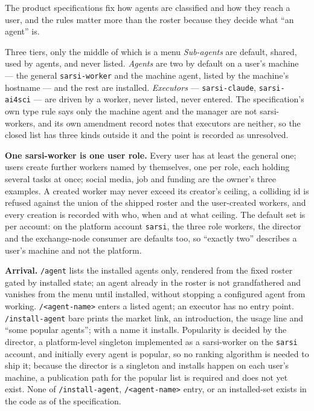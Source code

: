 \documentclass[11pt]{article}
\theoremstyle{definition}
\begin{document}
The product specifications fix how agents are classified and how they reach a user, and the rules matter more than the roster because they decide what ``an agent'' is.

\begin{claimbox}{Three tiers, only the middle of which is a menu}
\emph{Sub-agents} are default, shared, used by agents, and never listed. \emph{Agents} are two by default on a user's machine --- the general \texttt{sarsi-worker} and the machine agent, listed by the machine's hostname --- and the rest are installed. \emph{Executors} --- \texttt{sarsi-claude}, \texttt{sarsi-ai4sci} --- are driven by a worker, never listed, never entered. The specification's own type rule says only the machine agent and the manager are not sarsi-workers, and its own amendment record notes that executors are neither, so the closed list has three kinds outside it and the point is recorded as unresolved.
\end{claimbox}

\textbf{One sarsi-worker is one user role.} Every user has at least the general one; users create further workers named by themselves, one per role, each holding several tasks at once; social media, job and funding are the owner's three examples. A created worker may never exceed its creator's ceiling, a colliding id is refused against the union of the shipped roster and the user-created workers, and every creation is recorded with who, when and at what ceiling. The default set is per account: on the platform account \texttt{sarsi}, the three role workers, the director and the exchange-node consumer are defaults too, so ``exactly two'' describes a user's machine and not the platform.

\textbf{Arrival.} \texttt{/agent} lists the installed agents only, rendered from the fixed roster gated by installed state; an agent already in the roster is not grandfathered and vanishes from the menu until installed, without stopping a configured agent from working. \texttt{/<agent-name>} enters a listed agent; an executor has no entry point. \texttt{/install-agent} bare prints the market link, an introduction, the usage line and ``some popular agents''; with a name it installs. Popularity is decided by the director, a platform-level singleton implemented as a sarsi-worker on the \texttt{sarsi} account, and initially every agent is popular, so no ranking algorithm is needed to ship it; because the director is a singleton and installs happen on each user's machine, a publication path for the popular list is required and does not yet exist. None of \texttt{/install-agent}, \texttt{/<agent-name>} entry, or an installed-set exists in the code as of the specification.
\end{document}
